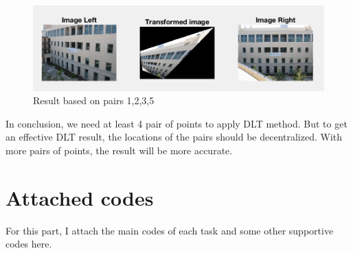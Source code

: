 \documentclass{article}
\begin{document}
\begin{figure}[htbp]
    \centering
    \includegraphics[scale = 0.6]{t2_4.png}
    \caption{Result based on pairs 1,2,3,5}
    \label{fig30}
\end{figure}

In conclusion, we need at least 4 pair of points to apply DLT method. But to get an effective DLT result, the locations of the pairs should be decentralized. With more pairs of points, the result will be more accurate.

\section*{Attached codes}
For this part, I attach the main codes of each task and some other supportive codes here.
\end{document}
